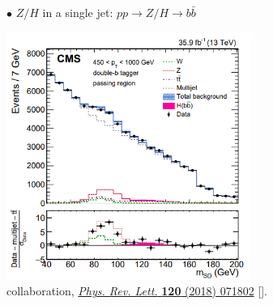 \documentclass[9pt,a4paper,unknownkeysallowed,xcolor=dvipsnames,aspectratio=43]{beamer}
\begin{document}
\begin{frame}\vspace{2mm}

{\color{darkred}\Large$\bullet$} $Z/H$ in a single jet: $pp\to Z/H \to b\bar{b}$
\vspace{2mm}
\begin{center}
\includegraphics[width=0.6\textwidth]{05/HSD.PNG}\\\vspace{1mm}
{\tiny\color{teablue}{\scshape CMS} collaboration,%
  \href{https://doi.org/10.1103/PhysRevLett.120.071802}{\emph{Phys. Rev. Lett.}
  {\bfseries 120} (2018) 071802}
  [\href{https://arxiv.org/abs/1709.05543}{{}}].}
\end{center}
\end{frame}
%
%
\end{document}
